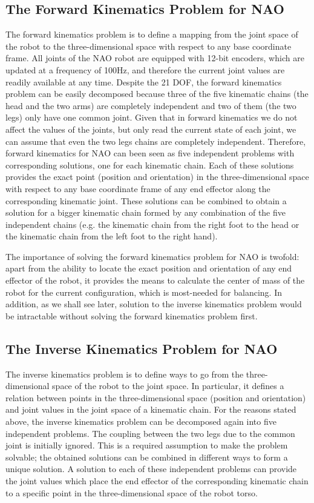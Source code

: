 \subsection{The Forward Kinematics Problem for NAO}
The forward kinematics problem is to define a mapping from the joint space of the robot to the three-dimensional space with respect to any base coordinate frame.
All joints of the NAO robot are equipped with 12-bit encoders, which are updated at a frequency of 100Hz, and therefore the current joint values are readily available at any time. Despite the 21 DOF, the forward kinematics problem can be easily decomposed because three of the five kinematic chains (the head and the two arms) are completely independent and two of them (the two legs) only have one common joint. Given that in forward kinematics we do not affect the values of the joints, but only read the current state of each joint, we can assume that even the two legs chains are completely independent. Therefore, forward kinematics for NAO can been seen as five independent problems with corresponding solutions, one for each kinematic chain. Each of these solutions provides the exact point (position and orientation) in the three-dimensional space with respect to any base coordinate frame of any end effector along the corresponding kinematic joint. These solutions can be combined to obtain a solution for a bigger kinematic chain formed by any combination of the five independent chains (e.g. the kinematic chain from the right foot to the head or the kinematic chain from the left foot to the right hand). 

The importance of solving the forward kinematics problem for NAO is twofold: apart from the ability to locate the exact position and orientation of any end effector of the robot, it provides the means to calculate the center of mass of the robot for the current configuration, which is most-needed for balancing. In addition, as we shall see later, solution to the inverse kinematics problem would be intractable without solving the forward kinematics problem first.

\subsection{The Inverse Kinematics Problem for NAO}
The inverse kinematics problem is to define ways to go from the three-dimensional space of the robot to the joint space. In particular, it defines a relation between points in the three-dimensional space (position and orientation) and joint values in the joint space of a kinematic chain. For the reasons stated above, the inverse kinematics problem can be decomposed again into five independent problems. The coupling between the two legs due to the common joint is initially ignored. This is a required assumption to make the problem solvable; the obtained solutions can be combined in different ways to form a unique solution. A solution to each of these independent problems can provide the joint values which place the end effector of the corresponding kinematic chain to a specific point in the three-dimensional space of the robot torso. 

